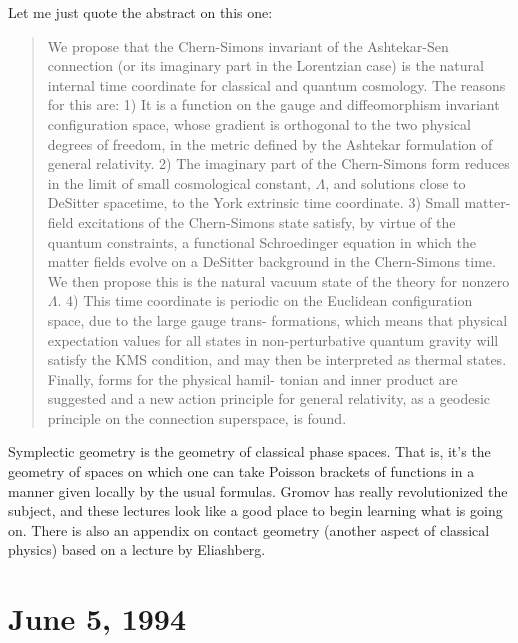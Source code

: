 \documentclass{article}
\def\tightlist{}
\renewcommand{\texttt}[1]{%
  \begingroup
  \ttfamily
  \begingroup\lccode`~=`/\lowercase{\endgroup\def~}{/\discretionary{}{}{}}%
  \begingroup\lccode`~=`[\lowercase{\endgroup\def~}{[\discretionary{}{}{}}%
  \begingroup\lccode`~=`.\lowercase{\endgroup\def~}{.\discretionary{}{}{}}%
  \catcode`/=\active\catcode`[=\active\catcode`.=\active
  \scantokens{#1\noexpand}%
  \endgroup
}
\begin{document}
Let me just quote the abstract on this one:

\begin{quote}
We propose that the Chern-Simons invariant of the Ashtekar-Sen
connection (or its imaginary part in the Lorentzian case) is the natural
internal time coordinate for classical and quantum cosmology. The
reasons for this are: 1) It is a function on the gauge and
diffeomorphism invariant configuration space, whose gradient is
orthogonal to the two physical degrees of freedom, in the metric defined
by the Ashtekar formulation of general relativity. 2) The imaginary part
of the Chern-Simons form reduces in the limit of small cosmological
constant, \(\Lambda\), and solutions close to DeSitter spacetime, to the
York extrinsic time coordinate. 3) Small matter-field excitations of the
Chern-Simons state satisfy, by virtue of the quantum constraints, a
functional Schroedinger equation in which the matter fields evolve on a
DeSitter background in the Chern-Simons time. We then propose this is
the natural vacuum state of the theory for nonzero \(\Lambda\). 4) This
time coordinate is periodic on the Euclidean configuration space, due to
the large gauge trans- formations, which means that physical expectation
values for all states in non-perturbative quantum gravity will satisfy
the KMS condition, and may then be interpreted as thermal states.
Finally, forms for the physical hamil- tonian and inner product are
suggested and a new action principle for general relativity, as a
geodesic principle on the connection superspace, is found.
\end{quote}


Symplectic geometry is the geometry of classical phase spaces. That is,
it's the geometry of spaces on which one can take Poisson brackets of
functions in a manner given locally by the usual formulas. Gromov has
really revolutionized the subject, and these lectures look like a good
place to begin learning what is going on. There is also an appendix on
contact geometry (another aspect of classical physics) based on a
lecture by Eliashberg.
\hypertarget{week35}{%
\section{June 5, 1994}\label{week35}}
\end{document}
